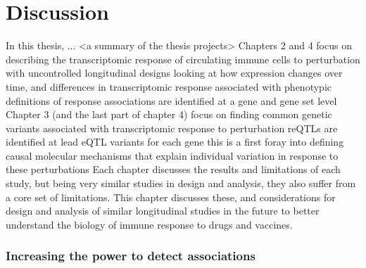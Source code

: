 %
%

\chapter{Discussion}
\label{ch:discussion}

\begin{outline}

\1 In this thesis, ... <a summary of the thesis projects>
    \2 Chapters 2 and 4 focus on describing the transcriptomic response of circulating immune cells to perturbation with uncontrolled longitudinal designs
        \3 looking at how expression changes over time, and differences in transcriptomic response associated with phenotypic definitions of response
        \3 associations are identified at a gene and gene set level
    \2 Chapter 3 (and the last part of chapter 4) focus on finding common genetic variants associated with transcriptomic response to perturbation
        \3 reQTLs are identified at lead eQTL variants for each gene
        \3 this is a first foray into defining causal molecular mechanisms that explain individual variation in response to these perturbations
    \2 Each chapter discusses the results and limitations of each study, but being very similar studies in design and analysis, they also suffer from a core set of limitations.
    \2 This chapter discusses these, and considerations for design and analysis of similar longitudinal studies in the future to better understand the biology of immune response to drugs and vaccines.

\subsection{Increasing the power to detect associations}


\end{outline}
